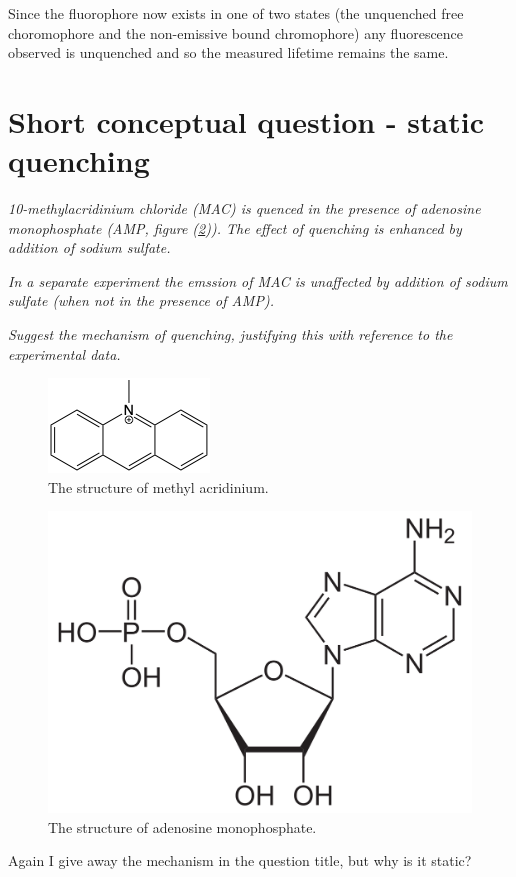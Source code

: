 \documentclass[
]{book}
\begin{document}
Since the fluorophore now exists in one of two states (the unquenched free choromophore and the non-emissive bound chromophore) any fluorescence observed is unquenched and so the measured lifetime remains the same.

\hypertarget{sec:static2}{%
\section{Short conceptual question - static quenching}\label{sec:static2}}

\emph{10-methylacridinium chloride (MAC) is quenced in the presence of adenosine monophosphate (AMP, figure (\ref{fig:AMP})). The effect of quenching is enhanced by addition of sodium sulfate.}

\emph{In a separate experiment the emssion of MAC is unaffected by addition of sodium sulfate (when not in the presence of AMP).}

\emph{Suggest the mechanism of quenching, justifying this with reference to the experimental data.}

\begin{figure}

{\centering \includegraphics[width=0.3\linewidth]{images/MAC} 

}

\caption{The structure of methyl acridinium.}\label{fig:MAC}
\end{figure}

\begin{figure}

{\centering \includegraphics[width=0.3\linewidth]{images/AMP} 

}

\caption{The structure of adenosine monophosphate.}\label{fig:AMP}
\end{figure}

Again I give away the mechanism in the question title, but why is it static?
\end{document}
